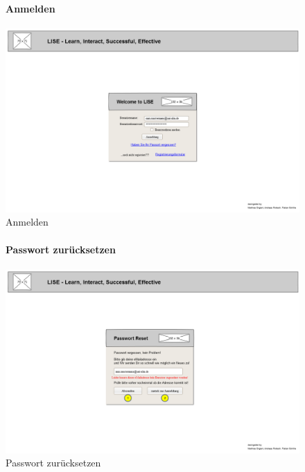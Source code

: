 \documentclass[12pt,a4paper]{article}
\begin{document}
{\begin{figure}[H]
	\centering
	\paragraph{Anmelden}
	\includegraphics[width=\textwidth]{Bilder/Mockups/GUI/Anmeldung.png}
	\caption{Anmelden}
	\label{GuiAnmelden}
\end{figure}

\begin{figure}[H]
	\centering
	\paragraph{Passwort zurücksetzen}
	\includegraphics[width=\textwidth]{Bilder/Mockups/GUI/PasswortVergessen.png}
	\caption{Passwort zurücksetzen}
	\label{GuiPasswortVergessen}
\end{figure}


\begin{figure}[H]
	\centering

\end{figure}}
\end{document}
